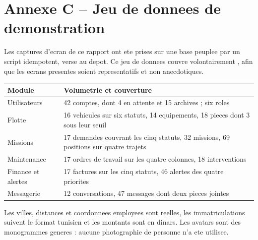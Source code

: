\section*{Annexe C -- Jeu de donnees de demonstration}

Les captures d'ecran de ce rapport ont ete prises sur une base peuplee
par un script idempotent, verse au depot. Ce jeu de donnees couvre
volontairement , afin que
les ecrans presentes soient representatifs et non anecdotiques.

\begin{table}[H]
\centering
\small
\begin{tabularx}{\textwidth}{@{}p{4.3cm}X@{}}
\toprule
\textbf{Module} & \textbf{Volumetrie et couverture} \\ \midrule
Utilisateurs & 42 comptes, dont 4 en attente et 15 archives ; six roles \\
Flotte & 16 vehicules sur six statuts, 14 equipements, 18 pieces dont 3
  sous leur seuil \\
Missions & 17 demandes couvrant les cinq statuts, 32 missions, 69
  positions sur quatre trajets \\
Maintenance & 17 ordres de travail sur les quatre colonnes, 18
  interventions \\
Finance et alertes & 17 factures sur les cinq statuts, 46 alertes des
  quatre priorites \\
Messagerie & 12 conversations, 47 messages dont deux pieces jointes \\
\bottomrule
\end{tabularx}
\end{table}

Les villes, distances et coordonnees employees sont reelles, les
immatriculations suivent le format tunisien et les montants sont en
dinars. Les avatars sont des monogrammes generes : aucune photographie de
personne n'a ete utilisee.
